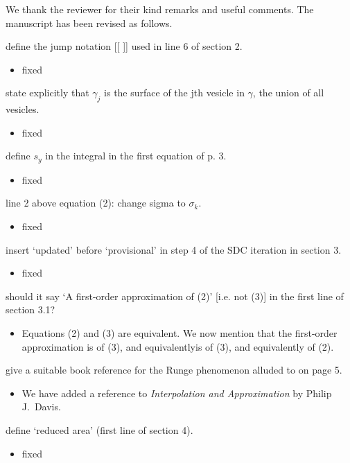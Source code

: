 \documentclass[12pt]{article}
\newcommand{\comment}[1]{{\color{blue} #1}}
\begin{document}
We thank the reviewer for their kind remarks and useful comments.  The
manuscript has been revised as follows.


\noindent
\comment{define the jump notation [[ ]] used in line 6 of section 2.}
\begin{itemize}
\item fixed
\end{itemize}

\noindent
\comment{state explicitly that $\gamma_j$ is the surface of the jth
vesicle in $\gamma$, the union of all vesicles.}
\begin{itemize}
\item fixed
\end{itemize}

\noindent
\comment{define $s_{y}$ in the integral in the first equation of p. 3.}
\begin{itemize}
\item fixed
\end{itemize}

\noindent
\comment{line 2 above equation (2): change sigma to $\sigma_{k}$.}
\begin{itemize}
\item fixed
\end{itemize}

\noindent
\comment{insert `updated' before `provisional' in step 4 of the SDC
iteration in section 3.}
\begin{itemize}
\item fixed
\end{itemize}

\noindent
\comment{should it say `A first-order approximation of (2)' [i.e. not
(3)] in the first line of section 3.1?}
\begin{itemize}
\item Equations (2) and (3) are equivalent.  We now mention that the
first-order approximation is of (3), and equivalentlyis of (3), and
equivalently of (2). 
\end{itemize}

\noindent
\comment{give a suitable book reference for the Runge phenomenon
alluded to on page 5.}
\begin{itemize}
\item We have added a reference to {\em Interpolation and
Approximation} by Philip J.~Davis.
\end{itemize}

\noindent
\comment{define `reduced area' (first line of section 4).}
\begin{itemize}
\item fixed
\end{itemize}
\end{document}
